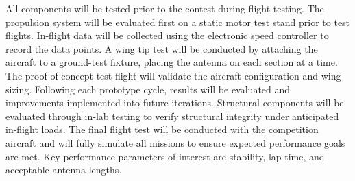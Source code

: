 All components will be tested prior to the contest during flight testing. The propulsion system will be evaluated first on a static motor test stand prior to test flights. In-flight data will be collected using the electronic speed controller to record the data points. A wing tip test will be conducted by attaching the aircraft to a ground-test fixture, placing the antenna on each section at a time. The proof of concept test flight will validate the aircraft configuration and wing sizing.
Following each prototype cycle, results will be evaluated and improvements implemented into future iterations. Structural components will be evaluated through in-lab testing to verify structural integrity under anticipated in-flight loads. The final flight test will be conducted with the competition aircraft and will fully simulate all missions to ensure expected performance goals are met. Key performance parameters of interest are stability, lap time, and acceptable antenna lengths.
